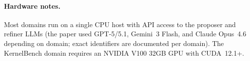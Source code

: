 \documentclass[sigconf]{acmart}
\begin{document}
\paragraph{Hardware notes.}
Most domains run on a single CPU host with API access to the proposer and
refiner LLMs (the paper used GPT-5/5.1, Gemini~3 Flash, and Claude Opus~4.6
depending on domain; exact identifiers are documented per domain). The
KernelBench domain requires an NVIDIA V100 32GB GPU with CUDA~12.1+.
\end{document}
